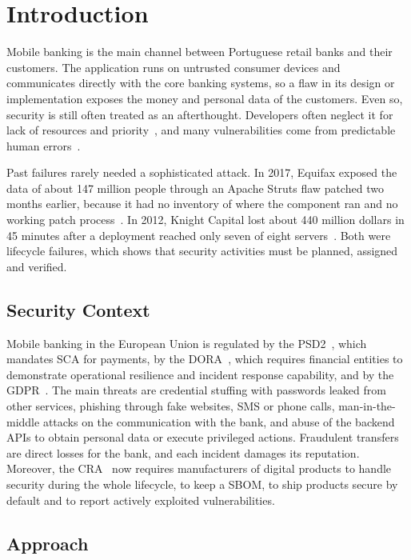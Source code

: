 \section{Introduction}
\label{sec:introduction}

Mobile banking is the main channel between Portuguese retail banks and
their customers. The application runs on untrusted consumer devices and
communicates directly with the core banking systems, so a flaw in its
design or implementation exposes the money and personal data of the
customers. Even so, security is still often treated as an afterthought.
Developers often neglect it for lack of resources and priority~\cite{assal2018soups},
and many vulnerabilities come from predictable human errors~\cite{anu2020human}.

Past failures rarely needed a sophisticated attack. In 2017, Equifax
exposed the data of about 147 million people through an Apache Struts flaw
patched two months earlier, because it had no inventory of where the
component ran and no working patch process~\cite{equifax2018}. In 2012, Knight Capital
lost about 440 million dollars in 45 minutes after a deployment reached
only seven of eight servers~\cite{knight2013}. Both were lifecycle
failures, which shows that security activities must be planned, assigned
and verified.

\subsection{Security Context}

Mobile banking in the European Union is regulated by the \ac{PSD2}~\cite{psd2},
which mandates \ac{SCA} for payments, by the \ac{DORA}~\cite{dora}, which
requires financial entities to demonstrate operational resilience and
incident response capability, and by the \ac{GDPR}~\cite{gdpr}. The main
threats are credential stuffing with passwords leaked from other services,
phishing through fake websites, SMS or phone calls, man-in-the-middle
attacks on the communication with the bank, and abuse of the backend
\acp{API} to obtain personal data or execute privileged actions. Fraudulent
transfers are direct losses for the bank, and each incident damages its
reputation. Moreover, the \ac{CRA}~\cite{cra} now requires manufacturers of
digital products to handle security during the whole lifecycle, to keep a
\ac{SBOM}, to ship products secure by default and to report actively
exploited vulnerabilities.

\subsection{Approach}

